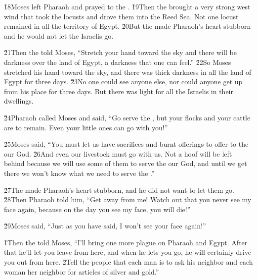\v{18}Moses left Pharaoh and prayed to the . \v{19}Then the  brought a very strong west wind that took the locusts and drove them into the Reed Sea. Not one locust remained in all the territory of Egypt. \v{20}But the  made Pharaoh's heart stubborn and he would not let the Israelis go.

\v{21}Then the  told Moses, ``Stretch your hand toward the sky and there will be darkness over the land of Egypt, a darkness that one can feel.'' \v{22}So Moses stretched his hand toward the sky, and there was thick darkness in all the land of Egypt for three days. \v{23}No one could see anyone else, nor could anyone get up from his place for three days. But there was light for all the Israelis in their dwellings.

\v{24}Pharaoh called Moses and said, ``Go serve the , but your flocks and your cattle are to remain. Even your little ones can go with you!''

\v{25}Moses said, ``You must let us have sacrifices and burnt offerings to offer to the  our God. \v{26}And even our livestock must go with us. Not a hoof will be left behind because we will use some of them to serve the  our God, and until we get there we won't know what we need to serve the .''

\v{27}The  made Pharaoh's heart stubborn, and he did not want to let them go. \v{28}Then Pharaoh told him, ``Get away from me! Watch out that you never see my face again, because on the day you see my face, you will die!''

\v{29}Moses said, ``Just as you have said, I won't see your face again!''

\v{1}Then the  told Moses, ``I'll bring one more plague on Pharaoh and Egypt. After that he'll let you leave from here, and when he lets you go, he will certainly drive you out from here. \v{2}Tell the people that each man is to ask his neighbor and each woman her neighbor for articles of silver and gold.''

